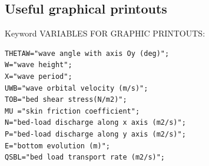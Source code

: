 \subsection{Useful graphical printouts}
Keyword {\ttfamily VARIABLES FOR GRAPHIC PRINTOUTS}:
\begin{lstlisting}[frame=trBL]
THETAW="wave angle with axis Oy (deg)";
W="wave height";
X="wave period";
UWB="wave orbital velocity (m/s)";
TOB="bed shear stress(N/m2)";
MU ="skin friction coefficient";
N="bed-load discharge along x axis (m2/s)";
P="bed-load discharge along y axis (m2/s)";
E="bottom evolution (m)";
QSBL="bed load transport rate (m2/s)";
\end{lstlisting}
